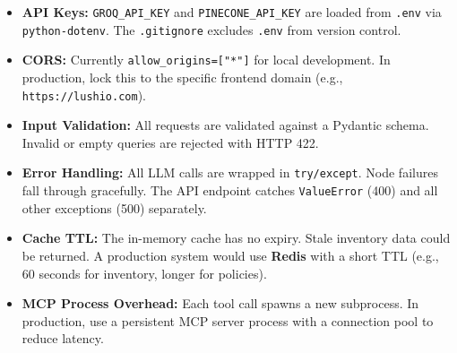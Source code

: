 \documentclass[12pt]{article}
\begin{document}
\begin{itemize}[leftmargin=1.5em]
    \item \textbf{API Keys:} \texttt{GROQ\_API\_KEY} and \texttt{PINECONE\_API\_KEY} are loaded from \texttt{.env} via \texttt{python-dotenv}. The \texttt{.gitignore} excludes \texttt{.env} from version control.
    \item \textbf{CORS:} Currently \texttt{allow\_origins=["*"]} for local development. In production, lock this to the specific frontend domain (e.g., \texttt{https://lushio.com}).
    \item \textbf{Input Validation:} All requests are validated against a Pydantic schema. Invalid or empty queries are rejected with HTTP 422.
    \item \textbf{Error Handling:} All LLM calls are wrapped in \texttt{try/except}. Node failures fall through gracefully. The API endpoint catches \texttt{ValueError} (400) and all other exceptions (500) separately.
    \item \textbf{Cache TTL:} The in-memory cache has no expiry. Stale inventory data could be returned. A production system would use \textbf{Redis} with a short TTL (e.g., 60 seconds for inventory, longer for policies).
    \item \textbf{MCP Process Overhead:} Each tool call spawns a new subprocess. In production, use a persistent MCP server process with a connection pool to reduce latency.
\end{itemize}
\end{document}

